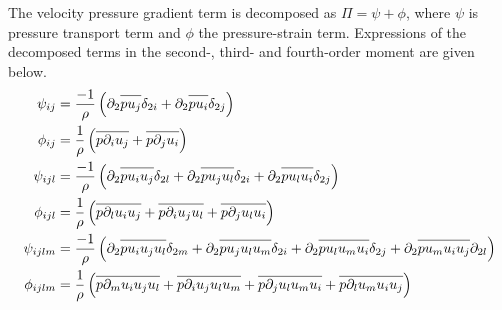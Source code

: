 \documentclass[letter,10pt,notitlepage]{article}
\newcommand*{\oline}[1]{\overline{#1\mathstrut}}
\begin{document}
The velocity pressure gradient term is decomposed as $\Pi = \psi + \phi$, where $\psi$ is pressure transport term and $\phi$ the pressure-strain term.  Expressions of the decomposed terms in the second-, third- and fourth-order moment are given below.
\begin{align}
\psi_{ij} &= \frac{-1}{\rho} \left( \partial_2\oline{pu_j}\delta_{2i}+\partial_2\oline{pu_i}\delta_{2j} \right) \\
\phi_{ij} &= \frac{1}{\rho} \left( \oline{p\partial_iu_j}+\oline{p\partial_ju_i} \right) \\
\psi_{ijl} &= \frac{-1}{\rho} \left( \partial_2\oline{pu_iu_j}\delta_{2l}+\partial_2\oline{pu_ju_l}\delta_{2i}+\partial_2\oline{pu_lu_i}\delta_{2j} \right) \\
\phi_{ijl} &= \frac{1}{\rho} \left( \oline{p\partial_lu_iu_j}+\oline{p\partial_iu_ju_l}+\oline{p\partial_ju_lu_i} \right) \\
\psi_{ijlm} &= \frac{-1}{\rho} \left( \partial_2\oline{pu_iu_ju_l}\delta_{2m}+\partial_2\oline{pu_ju_lu_m}\delta_{2i}+\partial_2\oline{pu_lu_mu_i}\delta_{2j}+\partial_2\oline{pu_mu_iu_j}\partial_{2l} \right) \\
\phi_{ijlm} &= \frac{1}{\rho} \left( \oline{p\partial_mu_iu_ju_l}+\oline{p\partial_iu_ju_lu_m}+\oline{p\partial_ju_lu_mu_i}+\oline{p\partial_lu_mu_iu_j} \right)
\end{align}
\end{document}

